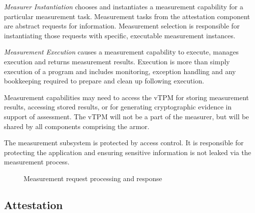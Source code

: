 \documentclass[10pt]{article}
\begin{document}
\emph{Measurer Instantiation} chooses and instantiates a measurement
capability for a particular measurement task.  Measurement tasks from
the attestation component are abstract requests for information.
Measurement selection is responsible for instantiating those requests
with specific, executable measurement instances.

\emph{Measurement Execution} causes a measurement capability to execute,
manages execution and returns measurement results.  Execution is more
than simply execution of a program and includes monitoring, exception
handling and any bookkeeping required to prepare and clean up
following execution.

Measurement capabilities may need to access the vTPM for storing
measurement results, accessing stored results, or for generating
cryptographic evidence in support of assessment.  The vTPM will not be
a part of the measurer, but will be shared by all components
comprising the armor.

The measurement subsystem is protected by access control.  It
is responsible for protecting the application and ensuring sensitive
information is not leaked via the measurement process.

\begin{figure}
\centering 
{}
  \caption{Measurement request processing and response}
  \label{fig:measurement}
\end{figure}

\subsection{Attestation}
\end{document}
